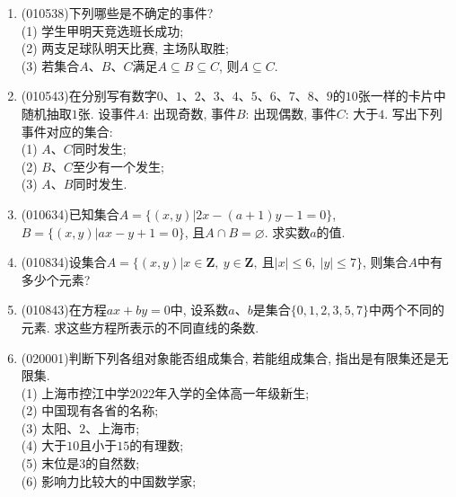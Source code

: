 \documentclass[10pt,a4paper]{article}
\newcommand{\blank}[1]{\underline{\hbox to #1pt{}}}
\begin{document}
\begin{enumerate}[1.]
\begin{center}
\end{center}
(1) 点$A$在平面$\alpha$上:\blank{50};\\
(2) 平面$\alpha$经过直线$AC$:\blank{50};\\
(3) 点$B$不在平面$\beta$上:\blank{50};\\
(4) 直线$BC$平行于平面$\beta$:\blank{50}.
\item {\tiny (010538)}下列哪些是不确定的事件?\\
(1) 学生甲明天竞选班长成功;\\
(2) 两支足球队明天比赛, 主场队取胜;\\
(3) 若集合$A$、$B$、$C$满足$A\subseteq B\subseteq C$, 则$A\subseteq C$.
\item {\tiny (010543)}在分别写有数字$0$、$1$、$2$、$3$、$4$、$5$、$6$、$7$、$8$、$9$的$10$张一样的卡片中随机抽取$1$张. 设事件$A$: 出现奇数, 事件$B$: 出现偶数, 事件$C$: 大于$4$. 写出下列事件对应的集合:\\
(1) $A$、$C$同时发生;\\
(2) $B$、$C$至少有一个发生;\\
(3) $A$、$B$同时发生.
\item {\tiny (010634)}已知集合$A=\{(x, y)|2x-(a+1)y-1=0\}$, $B=\{(x, y)|ax-y+1=0\}$, 且$A\cap B=\varnothing$. 求实数$a$的值.
\item {\tiny (010834)}设集合$A=\{(x, y)|x\in \mathbf{Z}, \  y\in \mathbf{Z}, \  \text{且}|x|\le 6, \ |y|\le 7\}$, 则集合$A$中有多少个元素?
\item {\tiny (010843)}在方程$ax+by=0$中, 设系数$a$、$b$是集合$\{0, 1, 2, 3, 5, 7\}$中两个不同的元素. 求这些方程所表示的不同直线的条数.
\item {\tiny (020001)}判断下列各组对象能否组成集合, 若能组成集合, 指出是有限集还是无限集.\\
(1) 上海市控江中学$2022$年入学的全体高一年级新生;\\
(2) 中国现有各省的名称;\\
(3) 太阳、$2$、上海市;\\
(4) 大于$10$且小于$15$的有理数;\\
(5) 末位是$3$的自然数;\\
(6) 影响力比较大的中国数学家;\\

\end{enumerate}
\end{document}
